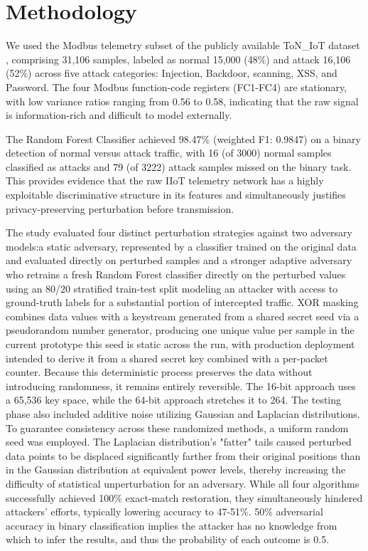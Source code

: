 \documentclass[conference]{IEEEtran}
\begin{document}
\section{Methodology}

We used the Modbus telemetry subset of the publicly available ToN\_IoT dataset \cite{dataset}, comprising 31,106 samples, labeled as normal 15,000 (48\%) and attack 16,106 (52\%) across five attack categories: Injection, Backdoor, scanning, XSS, and Password. The four Modbus function-code registers (FC1-FC4) are stationary, with low variance ratios ranging from 0.56 to 0.58, indicating that the raw signal is information-rich and difficult to model externally.

The Random Forest Classifier achieved 98.47\% (weighted F1: 0.9847) on a binary detection of normal versus attack traffic, with 16 (of 3000) normal samples classified as attacks and 79 (of 3222) attack samples missed on the binary task. This provides evidence that the raw IIoT telemetry network has a highly exploitable discriminative structure in its features and simultaneously justifies privacy-preserving perturbation before transmission. 

The study evaluated four distinct perturbation strategies against two adversary models:a static adversary, represented by a classifier trained on the original data and evaluated directly on perturbed samples and a stronger adaptive adversary who retrains a fresh Random Forest classifier directly on the perturbed values using an 80/20 stratified train-test split modeling an attacker with access to ground-truth labels for a substantial portion of intercepted traffic. XOR masking combines data values with a keystream generated from a shared secret seed via a pseudorandom number generator, producing one unique value per sample in the current prototype this seed is static across the run, with production deployment intended to derive it from a shared secret key combined with a per-packet counter. Because this deterministic process preserves the data without introducing randomness, it remains entirely reversible. The 16-bit approach uses a 65,536 key space, while the 64-bit approach stretches it to 264. The testing phase also included additive noise utilizing Gaussian and Laplacian distributions. To guarantee consistency across these randomized methods, a uniform random seed was employed. The Laplacian distribution's "fatter" tails caused perturbed data points to be displaced significantly farther from their original positions than in the Gaussian distribution at equivalent power levels, thereby increasing the difficulty of statistical unperturbation for an adversary. While all four algorithms successfully achieved 100\% exact-match restoration, they simultaneously hindered attackers' efforts, typically lowering accuracy to 47-51\%. 50\% adversarial accuracy in binary classification implies the attacker has no knowledge from which to infer the results, and thus the probability of each outcome is 0.5.
\end{document}
